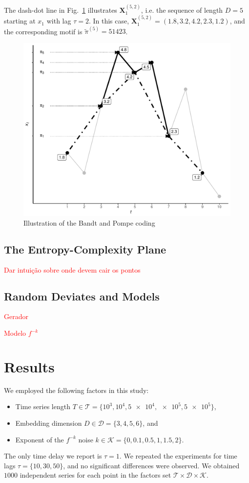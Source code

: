 \documentclass[sts]{imsart}
\begin{document}
The dash-dot line in Fig.~\ref{Fig:IntroBP} illustrates $\mathbf X_{1}^{(5,2)}$, i.e. the sequence of length $D=5$ starting at $x_1$ with lag $\tau=2$.
In this case, $\mathbf X_{1}^{(5,2)}= (1.8, 3.2, 4.2, 2.3, 1.2)$, and the corresponding motif is $\widetilde{\pi}^{(5)}=51423$.

\begin{figure}[hbt]
\centering
\includegraphics[width=.7\linewidth]{IntroBP}
\caption{Illustration of the Bandt and Pompe coding\label{Fig:IntroBP}}
\end{figure}

\subsection{The Entropy-Complexity Plane}

\textcolor{red}{Dar intui\c c\~ao sobre onde devem cair os pontos}

\subsection{Random Deviates and Models}

\textcolor{red}{Gerador}

\textcolor{red}{Modelo $f^{-k}$}

\section{Results}\label{Sec:Results}

We employed the following factors in this study:
\begin{itemize}
\item Time series length $T\in\mathcal T=\{10^3,10^4, \num[scientific-notation=true]{5 e4}, \num[scientific-notation=true]{e5}, \num[scientific-notation=true]{5 e5}\}$,
\item Embedding dimension $D\in\mathcal D=\{3, 4, 5, 6\}$, and
\item Exponent of the $f^{-k}$ noise $k\in\mathcal K=\{0, 0.1, 0.5, 1, 1.5, 2\}$.
\end{itemize}
The only time delay we report is $\tau=1$.
We repeated the experiments for time lags $\tau=\{10,30,50\}$, and no significant differences were observed.
We obtained $1000$ independent series for each point in the factors set $\mathcal T\times \mathcal D\times \mathcal K$.
\end{document}
